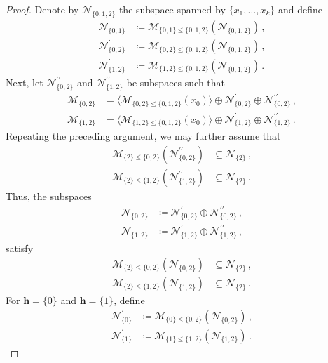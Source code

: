 \documentclass[reqno,12pt]{amsart}
\newcommand{\cM}{\mathcal{M}}
\newcommand{\cN}{\mathcal{N}}
\newcommand{\0}{\mathbf 0}
\newcommand{\h}{\mathbf{h}}
\theoremstyle{definition}
\begin{document}
\begin{proof}
    Denote by $\cN_{\{0,1,2\}}$ the subspace spanned by $\{x_1,\dots,x_k\}$ and define
    \[
    \begin{aligned}
        \cN_{\{0,1\}} &\coloneqq \cM_{\{0,1\}\leq\{0,1,2\}}(\cN_{\{0,1,2\}})\,, \\[1.5ex]
        \cN_{\{0,2\}}^{\prime} &\coloneqq \cM_{\{0,2\}\leq\{0,1,2\}}(\cN_{\{0,1,2\}})\,, \\[1.5ex]
        \cN_{\{1,2\}}^{\prime} &\coloneqq \cM_{\{1,2\}\leq\{0,1,2\}}(\cN_{\{0,1,2\}})\,.
    \end{aligned}
    \]
    Next, let $\cN_{\{0,2\}}^{\prime\prime}$ and $\cN_{\{1,2\}}^{\prime\prime}$ be subspaces such that
    \[
    \begin{aligned}
        \cM_{\{0,2\}}& =\langle\cM_{\{0,2\}\leq\{0,1,2\}}(x_0)\rangle \oplus \cN_{\{0,2\}}^{\prime}\oplus \cN_{\{0,2\}}^{\prime\prime}\, ,\\[1.5ex]
        \cM_{\{1,2\}}&=\langle \cM_{\{1,2\}\leq\{0,1,2\}}(x_0)\rangle \oplus \cN_{\{1,2\}}^{\prime}\oplus \cN_{\{1,2\}}^{\prime\prime}\, .
    \end{aligned}
    \]
    Repeating the preceding argument, we may further assume that
    \[
    \begin{aligned}
        \cM_{\{2\}\leq\{0,2\}}(\cN_{\{0,2\}}^{\prime\prime})&\subseteq \cN_{\{2\}}\,,\\[1.5ex]
        \cM_{\{2\}\leq\{1,2\}}(\cN_{\{1,2\}}^{\prime\prime})& \subseteq \cN_{\{2\}}\, .
    \end{aligned}
    \]
    Thus, the subspaces
    \[
    \begin{aligned}
    \cN_{\{0,2\}}&\coloneqq \cN_{\{0,2\}}^{\prime}\oplus \cN_{\{0,2\}}^{\prime\prime}\, ,\\[1.5ex]
    \cN_{\{1,2\}}&\coloneqq \cN_{\{1,2\}}^{\prime}\oplus \cN_{\{1,2\}}^{\prime\prime}\, ,
    \end{aligned}
    \]
    satisfy
    \[
    \begin{aligned}
        \cM_{\{2\}\leq\{0,2\}}(\cN_{\{0,2\}})&\subseteq \cN_{\{2\}}\,,\\[1.5ex]
        \cM_{\{2\}\leq\{1,2\}}(\cN_{\{1,2\}})& \subseteq \cN_{\{2\}}\, .
    \end{aligned}
    \]
    For $\h=\{0\}$ and $\h=\{1\}$, define
    \[
    \begin{aligned}
        \cN_{\{0\}}^{\prime}&\coloneqq \cM_{\{0\}\leq\{0,2\}}(\cN_{\{0,2\}})\, ,\\[1.5ex]
        \cN_{\{1\}}^{\prime}&\coloneqq \cM_{\{1\}\leq\{1,2\}}(\cN_{\{1,2\}})\, .

\end{aligned}\]
\end{proof}
\end{document}
